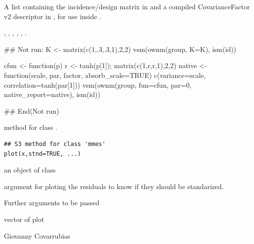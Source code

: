 \documentclass[a4paper]{book}
\begin{document}
%
\begin{Value}
A list containing the incidence/design matrix in  and a compiled CovarianceFactor v2 descriptor in , for use inside .
\end{Value}
%
\begin{SeeAlso}\relax
{}, , , , , .
\end{SeeAlso}
%
\begin{Examples}
\begin{ExampleCode}
## Not run: 
K <- matrix(c(1,.3,.3,1),2,2)
vsm(ownm(group, K=K), ism(id))

cfun <- function(p) {
  r <- tanh(p[1]); matrix(c(1,r,r,1),2,2)
}
native <- function(scale, par, factor, absorb_scale=TRUE) {
  c(variance=scale, correlation=tanh(par[1]))
}
vsm(ownm(group, fun=cfun, par=0, native_report=native), ism(id))

## End(Not run)
\end{ExampleCode}
\end{Examples}
%
\begin{Description}\relax
{} method for class .
\end{Description}
%
\begin{Usage}
\begin{verbatim}
## S3 method for class 'mmes'
plot(x,stnd=TRUE, ...)
\end{verbatim}
\end{Usage}
%
\begin{Arguments}
\begin{ldescription}
\item[\code{x}] an object of class 
\item[\code{stnd}] argument for ploting the residuals to know if they should be standarized.
\item[\code{...}] Further arguments to be passed
\end{ldescription}
\end{Arguments}
%
\begin{Value}
vector of plot

\end{Value}
%
\begin{Author}\relax
Giovanny Covarrubias 
\end{Author}
\end{document}
